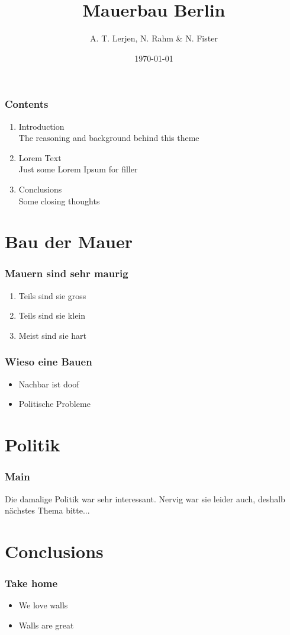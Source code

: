 \documentclass{beamer}
\title{Mauerbau Berlin}
\author{A. T. Lerjen, N. Rahm \& N. Fister}
\date{\today}
\begin{document}
	\setcounter{showProgressBar}{0}
	\setcounter{showSlideNumbers}{0}

	\frame{\titlepage}

	\begin{frame}
		\frametitle{Contents}
		\begin{enumerate}
			\item Introduction \\ \textcolor{ExecusharesGrey}{\footnotesize\hspace{1em} The reasoning and background behind this theme}
			\item Lorem Text  \\ \textcolor{ExecusharesGrey}{\footnotesize\hspace{1em} Just some Lorem Ipsum for filler}
			\item Conclusions \\ \textcolor{ExecusharesGrey}{\footnotesize\hspace{1em} Some closing thoughts}
		\end{enumerate}
	\end{frame}

	\setcounter{framenumber}{0}
	\setcounter{showProgressBar}{1}
	\setcounter{showSlideNumbers}{1}
	\section{Bau der Mauer}
		\begin{frame}
			\frametitle{Mauern sind sehr maurig}
			\begin{enumerate}
				\item Teils sind sie gross
				\item Teils sind sie klein
				\item Meist sind sie hart
			\end{enumerate}
		\end{frame}

		\begin{frame}
			\frametitle{Wieso eine Bauen}
			\begin{itemize}
				\item Nachbar ist doof
				\item Politische Probleme
			\end{itemize}
		\end{frame}

	\section{Politik}
		\begin{frame}
			\frametitle{Main}
			Die damalige Politik war sehr interessant. Nervig war sie leider auch, deshalb nächstes Thema bitte...
		\end{frame}

	\section{Conclusions}
		\begin{frame}
			\frametitle{Take home}
			\begin{itemize}
				\item We love walls
				\item Walls are great
			\end{itemize}
		\end{frame}
	
	\appendix
\end{document}
